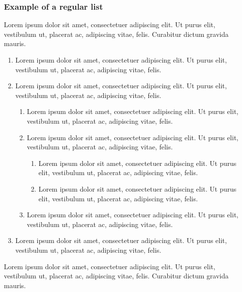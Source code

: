 \documentclass[draft*,nochapters]{aaltoseries}
\begin{document}
\subsubsection{Example of a regular list}
Lorem ipsum dolor sit amet, consectetuer adipiscing elit. Ut purus elit,  vestibulum ut, placerat ac, adipiscing vitae, felis. Curabitur dictum gravida mauris.
\begin{enumerate}
\item Lorem ipsum dolor sit amet, consectetuer adipiscing elit. Ut purus elit,  vestibulum ut, placerat ac, adipiscing vitae, felis.
\item Lorem ipsum dolor sit amet, consectetuer adipiscing elit. Ut purus elit,  vestibulum ut, placerat ac, adipiscing vitae, felis.
\begin{enumerate}
\item Lorem ipsum dolor sit amet, consectetuer adipiscing elit. Ut purus elit,  vestibulum ut, placerat ac, adipiscing vitae, felis.
\item Lorem ipsum dolor sit amet, consectetuer adipiscing elit. Ut purus elit,  vestibulum ut, placerat ac, adipiscing vitae, felis.
\begin{enumerate}
\item Lorem ipsum dolor sit amet, consectetuer adipiscing elit. Ut purus elit,  vestibulum ut, placerat ac, adipiscing vitae, felis.
\item Lorem ipsum dolor sit amet, consectetuer adipiscing elit. Ut purus elit,  vestibulum ut, placerat ac, adipiscing vitae, felis.
\end{enumerate}
\item Lorem ipsum dolor sit amet, consectetuer adipiscing elit. Ut purus elit,  vestibulum ut, placerat ac, adipiscing vitae, felis.
\end{enumerate}
\item Lorem ipsum dolor sit amet, consectetuer adipiscing elit. Ut purus elit,  vestibulum ut, placerat ac, adipiscing vitae, felis.
\end{enumerate}
Lorem ipsum dolor sit amet, consectetuer adipiscing elit. Ut purus elit,  vestibulum ut, placerat ac, adipiscing vitae, felis. Curabitur dictum gravida mauris.
\end{document}
